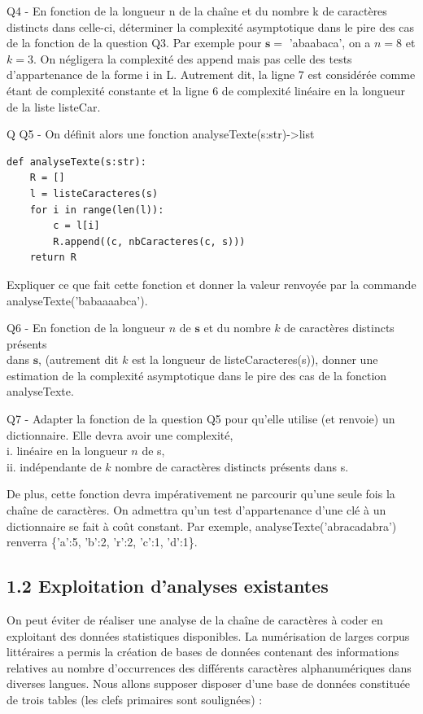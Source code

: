 \documentclass[10pt]{article}
\begin{document}
Q4 - En fonction de la longueur n de la chaîne et du nombre k de caractères distincts dans celle-ci, déterminer la complexité asymptotique dans le pire des cas de la fonction de la question Q3. Par exemple pour $\mathbf{s}=$ 'abaabaca', on a $n=8$ et $k=3$. On négligera la complexité des append mais pas celle des tests d'appartenance de la forme i in L. Autrement dit, la ligne 7 est considérée comme étant de complexité constante et la ligne 6 de complexité linéaire en la longueur de la liste listeCar.

Q Q5 - On définit alors une fonction analyseTexte(s:str)->list

\begin{verbatim}
def analyseTexte(s:str):
    R = []
    l = listeCaracteres(s)
    for i in range(len(l)):
        c = l[i]
        R.append((c, nbCaracteres(c, s)))
    return R
\end{verbatim}

Expliquer ce que fait cette fonction et donner la valeur renvoyée par la commande analyseTexte('babaaaabca').

Q6 - En fonction de la longueur $n$ de $\mathbf{s}$ et du nombre $k$ de caractères distincts présents\\
dans $\mathbf{s}$, (autrement dit $k$ est la longueur de listeCaracteres(s)), donner une estimation de la complexité asymptotique dans le pire des cas de la fonction analyseTexte.

Q7 - Adapter la fonction de la question Q5 pour qu'elle utilise (et renvoie) un dictionnaire. Elle devra avoir une complexité,\\
i. linéaire en la longueur $n$ de s,\\
ii. indépendante de $k$ nombre de caractères distincts présents dans s.

De plus, cette fonction devra impérativement ne parcourir qu'une seule fois la chaîne de caractères. On admettra qu'un test d'appartenance d'une clé à un dictionnaire se fait à coût constant. Par exemple, analyseTexte('abracadabra') renverra \{'a':5, 'b':2, 'r':2, 'c':1, 'd':1\}.

\subsection*{1.2 Exploitation d'analyses existantes}
On peut éviter de réaliser une analyse de la chaîne de caractères à coder en exploitant des données statistiques disponibles. La numérisation de larges corpus littéraires a permis la création de bases de données contenant des informations relatives au nombre d'occurrences des différents caractères alphanumériques dans diverses langues. Nous allons supposer disposer d'une base de données constituée de trois tables (les clefs primaires sont soulignées) :
\end{document}
